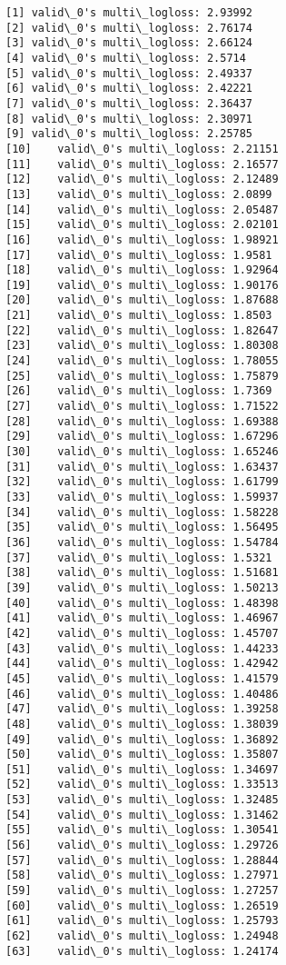 \documentclass[11pt]{article}
\begin{document}
    \begin{Verbatim}[commandchars=\\\{\}]
[1]	valid\_0's multi\_logloss: 2.93992
[2]	valid\_0's multi\_logloss: 2.76174
[3]	valid\_0's multi\_logloss: 2.66124
[4]	valid\_0's multi\_logloss: 2.5714
[5]	valid\_0's multi\_logloss: 2.49337
[6]	valid\_0's multi\_logloss: 2.42221
[7]	valid\_0's multi\_logloss: 2.36437
[8]	valid\_0's multi\_logloss: 2.30971
[9]	valid\_0's multi\_logloss: 2.25785
[10]	valid\_0's multi\_logloss: 2.21151
[11]	valid\_0's multi\_logloss: 2.16577
[12]	valid\_0's multi\_logloss: 2.12489
[13]	valid\_0's multi\_logloss: 2.0899
[14]	valid\_0's multi\_logloss: 2.05487
[15]	valid\_0's multi\_logloss: 2.02101
[16]	valid\_0's multi\_logloss: 1.98921
[17]	valid\_0's multi\_logloss: 1.9581
[18]	valid\_0's multi\_logloss: 1.92964
[19]	valid\_0's multi\_logloss: 1.90176
[20]	valid\_0's multi\_logloss: 1.87688
[21]	valid\_0's multi\_logloss: 1.8503
[22]	valid\_0's multi\_logloss: 1.82647
[23]	valid\_0's multi\_logloss: 1.80308
[24]	valid\_0's multi\_logloss: 1.78055
[25]	valid\_0's multi\_logloss: 1.75879
[26]	valid\_0's multi\_logloss: 1.7369
[27]	valid\_0's multi\_logloss: 1.71522
[28]	valid\_0's multi\_logloss: 1.69388
[29]	valid\_0's multi\_logloss: 1.67296
[30]	valid\_0's multi\_logloss: 1.65246
[31]	valid\_0's multi\_logloss: 1.63437
[32]	valid\_0's multi\_logloss: 1.61799
[33]	valid\_0's multi\_logloss: 1.59937
[34]	valid\_0's multi\_logloss: 1.58228
[35]	valid\_0's multi\_logloss: 1.56495
[36]	valid\_0's multi\_logloss: 1.54784
[37]	valid\_0's multi\_logloss: 1.5321
[38]	valid\_0's multi\_logloss: 1.51681
[39]	valid\_0's multi\_logloss: 1.50213
[40]	valid\_0's multi\_logloss: 1.48398
[41]	valid\_0's multi\_logloss: 1.46967
[42]	valid\_0's multi\_logloss: 1.45707
[43]	valid\_0's multi\_logloss: 1.44233
[44]	valid\_0's multi\_logloss: 1.42942
[45]	valid\_0's multi\_logloss: 1.41579
[46]	valid\_0's multi\_logloss: 1.40486
[47]	valid\_0's multi\_logloss: 1.39258
[48]	valid\_0's multi\_logloss: 1.38039
[49]	valid\_0's multi\_logloss: 1.36892
[50]	valid\_0's multi\_logloss: 1.35807
[51]	valid\_0's multi\_logloss: 1.34697
[52]	valid\_0's multi\_logloss: 1.33513
[53]	valid\_0's multi\_logloss: 1.32485
[54]	valid\_0's multi\_logloss: 1.31462
[55]	valid\_0's multi\_logloss: 1.30541
[56]	valid\_0's multi\_logloss: 1.29726
[57]	valid\_0's multi\_logloss: 1.28844
[58]	valid\_0's multi\_logloss: 1.27971
[59]	valid\_0's multi\_logloss: 1.27257
[60]	valid\_0's multi\_logloss: 1.26519
[61]	valid\_0's multi\_logloss: 1.25793
[62]	valid\_0's multi\_logloss: 1.24948
[63]	valid\_0's multi\_logloss: 1.24174

\end{Verbatim}
\end{document}
